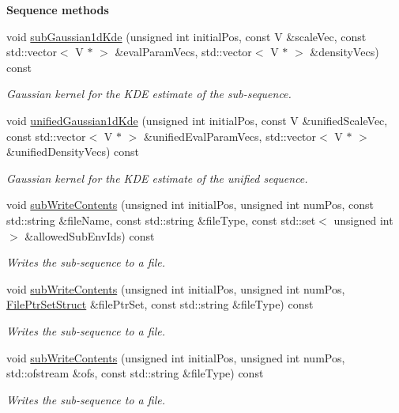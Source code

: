 \begin{Indent}{\bf Sequence methods}
\begin{DoxyCompactItemize}
void \hyperlink{class_q_u_e_s_o_1_1_sequence_of_vectors_a71c2d67969c2992c3c8a532734ddfcce}{sub\-Gaussian1d\-Kde} (unsigned int initial\-Pos, const V \&scale\-Vec, const std\-::vector$<$ V $\ast$ $>$ \&eval\-Param\-Vecs, std\-::vector$<$ V $\ast$ $>$ \&density\-Vecs) const 
\begin{DoxyCompactList}\small\item\em Gaussian kernel for the K\-D\-E estimate of the sub-\/sequence. \end{DoxyCompactList}\item 
void \hyperlink{class_q_u_e_s_o_1_1_sequence_of_vectors_a5605b0c15ee53f7fb1bfc89e08cf1fa7}{unified\-Gaussian1d\-Kde} (unsigned int initial\-Pos, const V \&unified\-Scale\-Vec, const std\-::vector$<$ V $\ast$ $>$ \&unified\-Eval\-Param\-Vecs, std\-::vector$<$ V $\ast$ $>$ \&unified\-Density\-Vecs) const 
\begin{DoxyCompactList}\small\item\em Gaussian kernel for the K\-D\-E estimate of the unified sequence. \end{DoxyCompactList}\item 
void \hyperlink{class_q_u_e_s_o_1_1_sequence_of_vectors_ab4342629e89ee72896cb844c54f821f3}{sub\-Write\-Contents} (unsigned int initial\-Pos, unsigned int num\-Pos, const std\-::string \&file\-Name, const std\-::string \&file\-Type, const std\-::set$<$ unsigned int $>$ \&allowed\-Sub\-Env\-Ids) const 
\begin{DoxyCompactList}\small\item\em Writes the sub-\/sequence to a file. \end{DoxyCompactList}\item 
void \hyperlink{class_q_u_e_s_o_1_1_sequence_of_vectors_a8bca3ab2c20f0b67ee2a32f970cc8ce8}{sub\-Write\-Contents} (unsigned int initial\-Pos, unsigned int num\-Pos, \hyperlink{struct_q_u_e_s_o_1_1_file_ptr_set_struct}{File\-Ptr\-Set\-Struct} \&file\-Ptr\-Set, const std\-::string \&file\-Type) const 
\begin{DoxyCompactList}\small\item\em Writes the sub-\/sequence to a file. \end{DoxyCompactList}\item 
void \hyperlink{class_q_u_e_s_o_1_1_sequence_of_vectors_a589a4141ec53e032dd2ad2aa6e223f70}{sub\-Write\-Contents} (unsigned int initial\-Pos, unsigned int num\-Pos, std\-::ofstream \&ofs, const std\-::string \&file\-Type) const 
\begin{DoxyCompactList}\small\item\em Writes the sub-\/sequence to a file. \end{DoxyCompactList}\item 

\end{DoxyCompactItemize}
\end{Indent}
